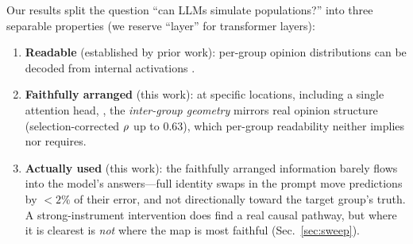 Our results split the question ``can LLMs simulate populations?'' into
three separable properties (we reserve ``layer'' for transformer layers):
\begin{enumerate}
  \item \textbf{Readable} (established by prior work): per-group opinion
        distributions can be decoded from internal activations
        \citep{llmopinions2026}.
  \item \textbf{Faithfully arranged} (this work): at specific locations,
        including a single attention head, \starhead, the \emph{inter-group
        geometry} mirrors real opinion structure (selection-corrected
        $\rho$ up to $0.63$), which per-group readability neither implies
        nor requires.
  \item \textbf{Actually used} (this work): the faithfully arranged
        information barely flows into the model's answers---full identity
        swaps in the prompt move predictions by ${<}2\%$ of their error,
        and not directionally toward the target group's truth. A
        strong-instrument intervention does find a real causal pathway,
        but where it is clearest is \emph{not} where the map is most
        faithful (Sec.~\ref{sec:sweep}).
\end{enumerate}


